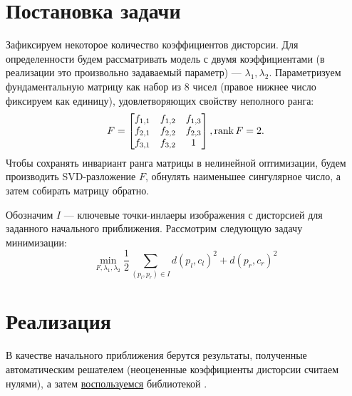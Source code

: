 \label{nonlinear}
\section{Постановка задачи}
Зафиксируем некоторое количество коэффициентов дисторсии. Для определенности будем рассматривать модель с двумя коэффициентами (в реализации это произвольно задаваемый параметр) --- $\lambda_1, 
\lambda_2$. Параметризуем фундаментальную матрицу как набор из 8 чисел (правое нижнее число фиксируем как единицу), удовлетворяющих свойству неполного ранга:
\begin{equation}
	F = \begin{bmatrix}
	f_{1,1} & f_{1,2} & f_{1,3} \\
	f_{2,1} & f_{2,2} & f_{2,3} \\
	f_{3,1} & f_{3,2} & 1 \\
	\end{bmatrix}, \operatorname{rank} F = 2.
\end{equation}
Чтобы сохранять инвариант ранга матрицы в нелинейной оптимизации, будем производить SVD-разложение $F$, обнулять наименьшее сингулярное число, а затем собирать матрицу обратно.

Обозначим $I$ --- ключевые точки-инлаеры изображения с дисторсией для заданного начального приближения. Рассмотрим следующую задачу минимизации: 
\begin{equation}
	\min\limits_{F, \lambda_1, \lambda_2} \frac{1}{2}\sum\limits_{\left(p_l, p_r\right) \in I} d\left(p_l, c_l\right)^2 + d\left(p_r, c_r\right)^2
\end{equation}

\section{Реализация}
В качестве начального приближения берутся результаты, полученные автоматическим решателем (неоцененные коэффициенты дисторсии считаем нулями), а затем \href{https://github.com/QuantumMechanicus/camera_calibration_test/blob/dev/subroutines/non_linear_optimizer/Non_Linear_Estimator.cpp}{воспользуемся} библиотекой \cite{ceres-solver}. 